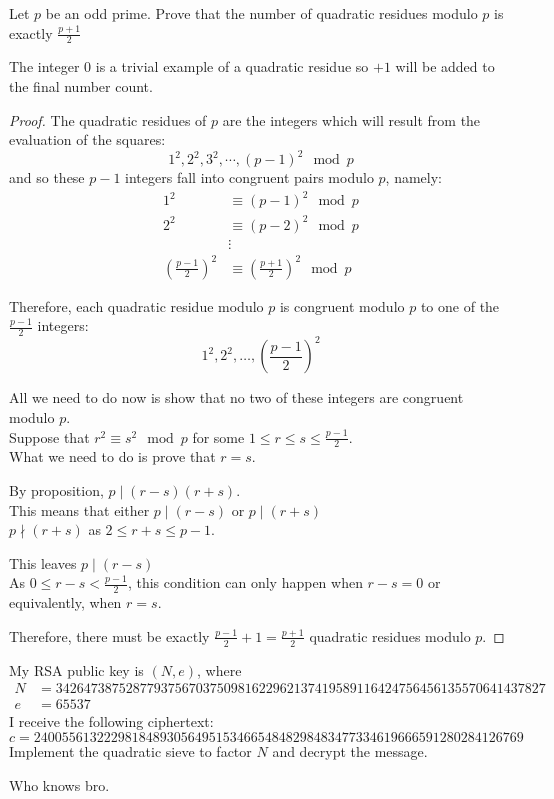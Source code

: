 \documentclass[12pt]{article}
\begin{document}
\newpage
\problem Let $p$ be an odd prime. Prove that the number of quadratic residues modulo $p$ is exactly $\frac{p+1}{2}$

\solution
The integer $0$ is a trivial example of a quadratic residue so $+1$ will be added to the final number count.
\begin{proof}
    The quadratic residues of $p$ are the integers which will result from the evaluation of the squares:
    \[1^2,2^2,3^2,\cdots,(p-1)^2\mod{p}\]
    and so these $p-1$ integers fall into congruent pairs modulo $p$, namely:
    \begin{align*}
        1^2                          & \equiv (p-1)^2\mod{p}                      \\
        2^2                          & \equiv (p-2)^2\mod{p}                      \\
                                     & \vdots                                     \\
        \left(\frac{p-1}{2}\right)^2 & \equiv \left(\frac{p+1}{2}\right)^2\mod{p}
    \end{align*}

    \noindent
    Therefore, each quadratic residue modulo $p$ is congruent modulo $p$ to one of the $\frac{p-1}{2}$ integers:
    \[1^2,2^2,\dots,\left(\frac{p-1}{2}\right)^2\]

    \noindent
    All we need to do now is show that no two of these integers are congruent modulo $p$.\\
    Suppose that $r^2\equiv s^2\mod{p}$ for some $1\leq r\leq s\leq\frac{p-1}{2}$.\\
    What we need to do is prove that $r=s$.

    \noindent
    By proposition, $p\mid(r-s)(r+s)$.\\
    This means that either $p\mid(r-s)$ or $p\mid(r+s)$\\
    $p\nmid(r+s)$ as $2\leq r+s\leq p-1$.

    \noindent
    This leaves $p\mid(r-s)$\\
    As $0\leq r-s<\frac{p-1}{2}$, this condition can only happen when $r-s=0$ or equivalently, when $r=s$.

    \noindent
    Therefore, there must be exactly $\frac{p-1}{2}+1=\frac{p+1}{2}$ quadratic residues modulo $p$.
\end{proof}

\newpage
\problem My RSA public key is $(N,e)$, where
\begin{align*}
    N & = 3426473875287793756703750981622962137419589116424756456135570641437827 \\
    e & = 65537
\end{align*}
I receive the following ciphertext:
\[c=2400556132229818489305649515346654848298483477334619666591280284126769\]
Implement the quadratic sieve to factor $N$ and decrypt the message.

\solution
Who knows bro.
\end{document}
